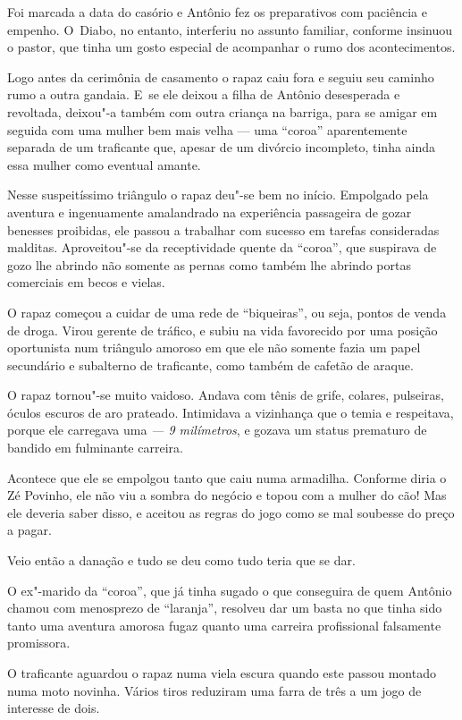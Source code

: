 Foi marcada a data do casório e Antônio fez os preparativos com
paciência e empenho. O~Diabo, no entanto, interferiu no assunto
familiar, conforme insinuou o pastor, que tinha um gosto especial de
acompanhar o rumo dos acontecimentos.

Logo antes da cerimônia de casamento o rapaz caiu fora e seguiu seu
caminho rumo a outra gandaia. E~se ele deixou a filha de Antônio desesperada e revoltada, deixou"-a
também com outra criança na barriga, para se amigar em seguida com uma
mulher bem mais velha --- uma ``coroa'' aparentemente separada de um
traficante que, apesar de um divórcio incompleto, tinha ainda essa
mulher como eventual amante.

Nesse suspeitíssimo triângulo o rapaz deu"-se bem no início. Empolgado
pela aventura e ingenuamente amalandrado na experiência passageira de
gozar benesses proibidas, ele passou a trabalhar com sucesso em tarefas
consideradas malditas. Aproveitou"-se da receptividade quente da
``coroa'', que suspirava de gozo lhe abrindo não somente as pernas como
também lhe abrindo portas comerciais em becos e vielas.

O rapaz começou a cuidar de uma rede de ``biqueiras'', ou seja, pontos
de venda de droga. Virou gerente de tráfico, e subiu na vida favorecido
por uma posição oportunista num triângulo amoroso em que ele não somente
fazia um papel secundário e subalterno de traficante, como também de
cafetão de araque.

O rapaz tornou"-se muito vaidoso. Andava com tênis de grife, colares,
pulseiras, óculos escuros de aro prateado. Intimidava a vizinhança que o
temia e respeitava, porque ele carregava uma \emph{ --- 9 milímetros},
e gozava um status prematuro de bandido em fulminante carreira.

Acontece que ele se empolgou tanto que caiu numa armadilha. Conforme
diria o Zé Povinho, ele não viu a sombra do negócio e topou com a mulher
do cão! Mas ele deveria saber disso, e aceitou as regras do jogo como se
mal soubesse do preço a pagar.

Veio então a danação e tudo se deu como tudo teria que se dar.

O ex"-marido da ``coroa'', que já tinha sugado o que conseguira de quem
Antônio chamou com menosprezo de ``laranja'', resolveu dar um basta no
que tinha sido tanto uma aventura amorosa fugaz quanto uma carreira
profissional falsamente promissora.

O traficante aguardou o rapaz numa viela escura quando este passou
montado numa moto novinha. Vários tiros reduziram uma farra de três a um
jogo de interesse de dois.

